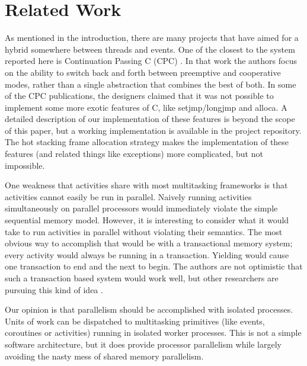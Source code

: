 \documentclass[pldi,10pt,preprint]{sigplanconf-pldi16}
\begin{document}


\section{Related Work}

As mentioned in the introduction, there are many projects that have aimed for a hybrid somewhere between threads and events.
One of the closest to the system reported here is Continuation Passing C (CPC) \cite{Kerneis2013}.
In that work the authors focus on the ability to switch back and forth between preemptive and cooperative modes, rather than a single abstraction that combines the best of both.
In some of the CPC publications, the designers claimed that it was not possible to implement some more exotic features of C, like setjmp/longjmp and alloca.
A detailed description of our implementation of these features is beyond the scope of this paper, but a working implementation is available in the project repository.
The hot stacking frame allocation strategy makes the implementation of these features (and related things like exceptions) more complicated, but not impossible.

One weakness that activities share with most multitasking frameworks is that activities cannot easily be run in parallel.
Naively running activities simultaneously on parallel processors would immediately violate the simple sequential memory model.
However, it is interesting to consider what it would take to run activities in parallel without violating their semantics.
The most obvious way to accomplish that would be with a transactional memory system; every activity would always be running in a transaction.
Yielding would cause one transaction to end and the next to begin.
The authors are not optimistic that such a transaction based system would work well, but other researchers are pursuing this kind of idea \cite{ONeill2015, Boussinot2006, Dabrowski2006}.

Our opinion is that parallelism should be accomplished with isolated processes.
Units of work can be dispatched to multitasking primitives (like events, coroutines or activities) running in isolated worker processes.
This is not a simple software architecture, but it does provide processor parallelism while largely avoiding the nasty mess of shared memory parallelism.
\end{document}
